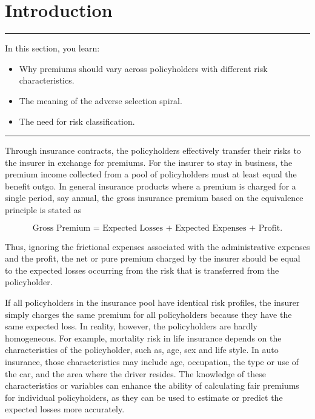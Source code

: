 \documentclass[]{book}
\providecommand{\tightlist}{%
  \setlength{\itemsep}{0pt}\setlength{\parskip}{0pt}}
\theoremstyle{definition}
\theoremstyle{definition}
\theoremstyle{definition}
\theoremstyle{remark}
\begin{document}
\section{Introduction}\label{S:RC:Introduction}

\begin{center}\rule{0.5\linewidth}{\linethickness}\end{center}

In this section, you learn:

\begin{itemize}
\tightlist
\item
  Why premiums should vary across policyholders with different risk
  characteristics.\\
\item
  The meaning of the adverse selection spiral.\\
\item
  The need for risk classification.
\end{itemize}

\begin{center}\rule{0.5\linewidth}{\linethickness}\end{center}

Through insurance contracts, the policyholders effectively transfer
their risks to the insurer in exchange for premiums. For the insurer to
stay in business, the premium income collected from a pool of
policyholders must at least equal the benefit outgo. In general
insurance products where a premium is charged for a single period, say
annual, the gross insurance premium based on the equivalence principle
is stated as

\[
\text{Gross Premium = Expected Losses + Expected Expenses + Profit}.
\]

Thus, ignoring the frictional expenses associated with the
administrative expenses and the profit, the net or pure premium charged
by the insurer should be equal to the expected losses occurring from the
risk that is transferred from the policyholder.

If all policyholders in the insurance pool have identical risk profiles,
the insurer simply charges the same premium for all policyholders
because they have the same expected loss. In reality, however, the
policyholders are hardly homogeneous. For example, mortality risk in
life insurance depends on the characteristics of the policyholder, such
as, age, sex and life style. In auto insurance, those characteristics
may include age, occupation, the type or use of the car, and the area
where the driver resides. The knowledge of these characteristics or
variables can enhance the ability of calculating fair premiums for
individual policyholders, as they can be used to estimate or predict the
expected losses more accurately.
\end{document}
